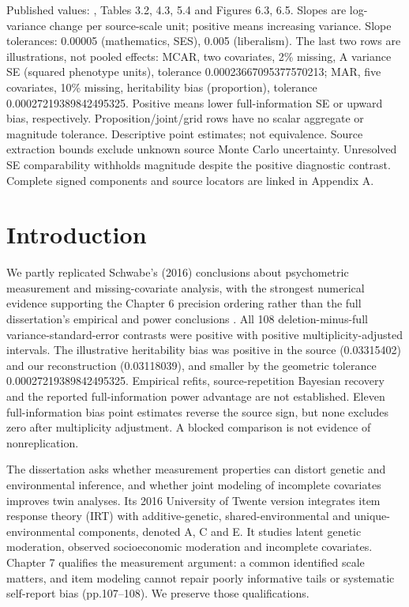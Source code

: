 \documentclass[11pt]{article}
\begin{document}
{\vspace{2pt}Published values: \citet{schwabe2016}, Tables 3.2, 4.3, 5.4 and Figures 6.3, 6.5. Slopes are log-variance change per source-scale unit; positive means increasing variance. Slope tolerances: 0.00005 (mathematics, SES), 0.005 (liberalism). The last two rows are illustrations, not pooled effects: MCAR, two covariates, 2\% missing, A variance SE (squared phenotype units), tolerance 0.00023667095377570213; MAR, five covariates, 10\% missing, heritability bias (proportion), tolerance 0.00027219389842495325. Positive means lower full-information SE or upward bias, respectively. Proposition/joint/grid rows have no scalar aggregate or magnitude tolerance. Descriptive point estimates; not equivalence. Source extraction bounds exclude unknown source Monte Carlo uncertainty. Unresolved SE comparability withholds magnitude despite the positive diagnostic contrast. Complete signed components and source locators are linked in Appendix A.
}
\clearpage
\section{Introduction}
We partly replicated Schwabe's (2016) conclusions about psychometric measurement and missing-covariate analysis, with the strongest numerical evidence supporting the Chapter 6 precision ordering rather than the full dissertation's empirical and power conclusions \citep{schwabe2016}. All 108 deletion-minus-full variance-standard-error contrasts were positive with positive multiplicity-adjusted intervals. The illustrative heritability bias was positive in the source (0.03315402) and our reconstruction (0.03118039), and smaller by the geometric tolerance 0.00027219389842495325. Empirical refits, source-repetition Bayesian recovery and the reported full-information power advantage are not established. Eleven full-information bias point estimates reverse the source sign, but none excludes zero after multiplicity adjustment. A blocked comparison is not evidence of nonreplication.

The dissertation asks whether measurement properties can distort genetic and environmental inference, and whether joint modeling of incomplete covariates improves twin analyses. Its 2016 University of Twente version integrates item response theory (IRT) with additive-genetic, shared-environmental and unique-environmental components, denoted A, C and E. It studies latent genetic moderation, observed socioeconomic moderation and incomplete covariates. Chapter 7 qualifies the measurement argument: a common identified scale matters, and item modeling cannot repair poorly informative tails or systematic self-report bias (pp.107--108). We preserve those qualifications.
\end{document}

